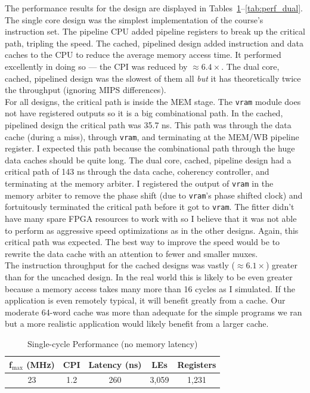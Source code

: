 \documentclass[12pt]{article}
\begin{document}
The performance results for the design are displayed in Tables~\ref{tab:perf_single}--\ref{tab:perf_dual}. The single core design was the simplest implementation of the course's instruction set. The pipeline CPU added pipeline registers to break up the critical path, tripling the speed. The cached, pipelined design added instruction and data caches to the CPU to reduce the average memory access time. It performed excellently in doing so --- the CPI was reduced by $\approx 6.4 \times$. The dual core, cached, pipelined design was the slowest of them all \emph{but} it has theoretically twice the throughput (ignoring MIPS differences).\\

For all designs, the critical path is inside the MEM stage. The \texttt{vram} module does not have registered outputs so it is a big combinational path. In the cached, pipelined design the critical path was 35.7 ns. This path was through the data cache (during a miss), through \texttt{vram}, and terminating at the MEM/WB pipeline register. I expected this path because the combinational path through the huge data caches should be quite long. The dual core, cached, pipeline design had a critical path of 143 ns through the data cache, coherency controller, and terminating at the memory arbiter. I registered the output of \texttt{vram} in the memory arbiter to remove the phase shift (due to \texttt{vram}'s phase shifted clock) and fortuitously terminated the critical path before it got to \texttt{vram}. The fitter didn't have many spare FPGA resources to work with so I believe that it was not able to perform as aggressive speed optimizations as in the other designs. Again, this critical path was expected. The best way to improve the speed would be to rewrite the data cache with an attention to fewer and smaller muxes.\\

The instruction throughput for the cached designs was vastly ($\approx 6.1 \times$) greater than for the uncached design. In the real world this is likely to be even greater because a memory access takes many more than 16 cycles as I simulated. If the application is even remotely typical, it will benefit greatly from a cache. Our moderate 64-word cache was more than adequate for the simple programs we ran but a more realistic application would likely benefit from a larger cache.

\begin{table}
\begin{center}

  \caption{Single-cycle Performance (no memory latency)}
  \begin{tabular}{| c | c | c | c | c |}
  \hline
  f$_{\textrm{max}}$ (MHz) & CPI & Latency (ns) & LEs & Registers \\ \hline
 23 & 1.2 & 260 & 3,059 & 1,231 \\ \hline
  \end{tabular}
  \end{center}

  \label{tab:perf_single}
\end{table}
\end{document}
